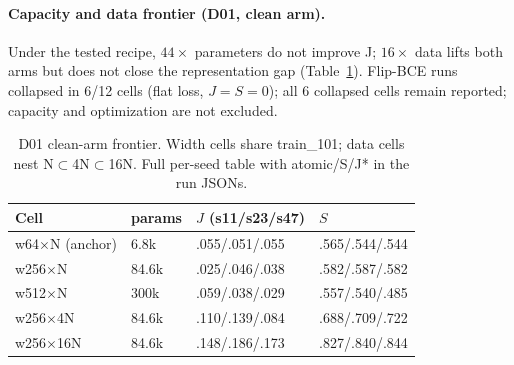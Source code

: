 \paragraph{Capacity and data frontier (D01, clean arm).} Under the tested recipe, $44\times$ parameters do not improve J; $16\times$ data lifts both arms but does not close the representation gap (Table~\ref{tab:d01}). Flip-BCE runs collapsed in 6/12 cells (flat loss, \(J{=}S{=}0\)); all 6 collapsed cells remain reported; capacity and optimization are not excluded.
\begin{table}[t]
\centering
\small
\begin{tabular}{@{}llll@{}}
\toprule
Cell & params & $J$ (s11/s23/s47) & $S$ \\
\midrule
w64$\times$N (anchor) & 6.8k & .055/.051/.055 & .565/.544/.544 \\
w256$\times$N & 84.6k & .025/.046/.038 & .582/.587/.582 \\
w512$\times$N & 300k & .059/.038/.029 & .557/.540/.485 \\
w256$\times$4N & 84.6k & .110/.139/.084 & .688/.709/.722 \\
w256$\times$16N & 84.6k & .148/.186/.173 & .827/.840/.844 \\
\bottomrule
\end{tabular}
\caption{D01 clean-arm frontier. Width cells share train\_101; data cells nest N$\subset$4N$\subset$16N. Full per-seed table with atomic/S/J* in the run JSONs.}
\label{tab:d01}
\end{table}
